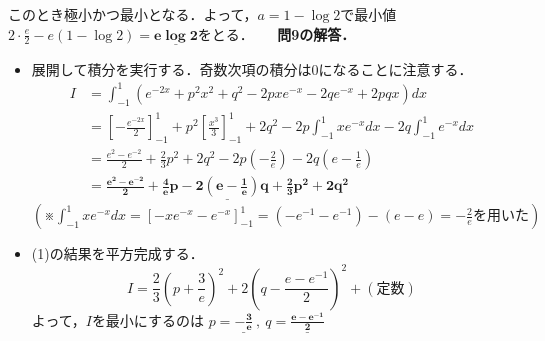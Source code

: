\documentclass[a4paper,11pt]{ltjsarticle}
\begin{document}
このとき極小かつ最小となる．よって，$a=1-\log 2$で最小値$\displaystyle{2\cdot\frac{e}{2}-e(1-\log 2) = \underline{\boldsymbol{e\log 2}}}$をとる．
　
\noindent\textbf{問9の解答．}\\[5pt]
\begin{itemize}
\item[(1)]展開して積分を実行する．奇数次項の積分は0になることに注意する．
\begin{align*}
I&=\int_{-1}^1(e^{-2x}+p^2x^2+q^2-2pxe^{-x}-2qe^{-x}+2pqx)dx\\
&=\left[-\frac{e^{-2x}}{2}\right]_{-1}^1 + p^2\left[\frac{x^3}{3}\right]_{-1}^1 + 2q^2 -2p\int_{-1}^1xe^{-x}dx -2q\int_{-1}^1e^{-x}dx\\
&=\frac{e^2-e^{-2}}{2} + \frac{2}{3}p^2 + 2q^2 -2p\left(-\frac{2}{e}\right) -2q\left(e-\frac{1}{e}\right)\\
&=\underline{\boldsymbol{\frac{e^2-e^{-2}}{2} + \frac{4}{e}p - 2\left(e-\frac{1}{e}\right)q + \frac{2}{3}p^2 + 2q^2}}
\end{align*}
$\left(※\displaystyle{\int_{-1}^1 xe^{-x}dx=[-xe^{-x}-e^{-x}]_{-1}^1=(-e^{-1}-e^{-1})-(e-e)=-\frac{2}{e}} \text{を用いた}\right)$
\item [(2)](1)の結果を平方完成する．
\[I = \frac{2}{3}\left(p+\frac{3}{e}\right)^2 + 2\left(q-\frac{e-e^{-1}}{2}\right)^2 + (\text{定数})\]
よって，$\displaystyle{I}$を最小にするのは
$\displaystyle{p=\underline{\boldsymbol{-\frac{3}{e}}}~,~q=\underline{\boldsymbol{\frac{e-e^{-1}}{2}}}}$
\end{itemize}
\end{document}
